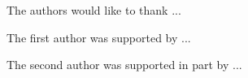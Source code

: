 \documentclass[aos]{imsart}
\theoremstyle{plain}
\begin{document}
%
%

\begin{acks}[Acknowledgments]
The authors would like to thank ...
\end{acks}
\begin{funding}
The first author was supported by ...

The second author was supported in part by ...
\end{funding}

\end{document}
